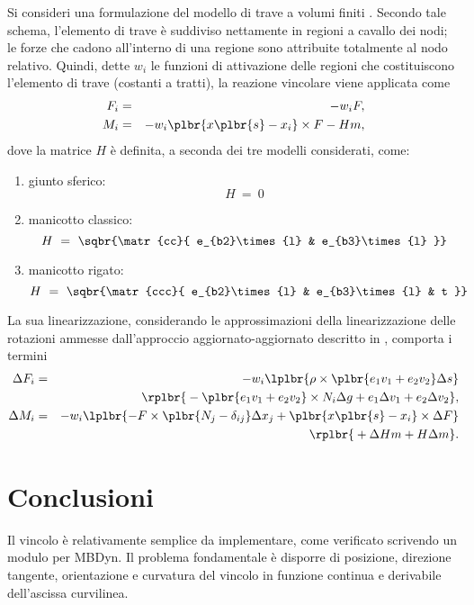 \documentclass[12pt,dvips,fleqn,italian]{article}
\begin{document}
\noindent
Si consideri una formulazione del modello di trave a volumi finiti
\cite{FV-AIAA}.
Secondo tale schema, l'elemento di trave \`{e} suddiviso nettamente in
regioni a cavallo dei nodi; le forze che cadono all'interno di una regione
sono attribuite totalmente al nodo relativo.
Quindi, dette $w_i$ le funzioni di attivazione delle regioni che
costituiscono l'elemento di trave (costanti a tratti), la reazione vincolare
viene applicata come
\begin{eqnarray*}
    F_i & = & - w_i F , \\
    M_i & = & - w_i \plbr{ x\plbr{s} - x_i }\times F 
        - H m ,
\end{eqnarray*}
dove la matrice $ H $ \`e definita, a seconda dei tre modelli considerati,
come:
\begin{enumerate}
	\item giunto sferico:
	\begin{displaymath}
		H \ = \ 0
	\end{displaymath}
	\item manicotto classico:
	\begin{displaymath}
		H \ = \ \sqbr{\matr{cc}{
			e_{b2}\times{l} & e_{b3}\times{l}
		}}
	\end{displaymath}
	\item manicotto rigato:
	\begin{displaymath}
		H \ = \ \sqbr{\matr{ccc}{
			e_{b2}\times{l} & e_{b3}\times{l} & t
		}}
	\end{displaymath}
\end{enumerate}
La sua linearizzazione, considerando le approssimazioni della
linearizzazione delle rotazioni ammesse dall'approccio aggiornato-aggiornato
descritto in \cite{PHD-MASARATI}, comporta i termini
\begin{eqnarray*}
    \Delta{F_i} & = & - w_i \lplbr{
        \rho \times \plbr{ e_1 v_1 + e_2 v_2 } \Delta{s}
    } \\
    & & \rplbr{ \mbox{}
	- \plbr{ e_1 v_1 + e_2 v_2 } \times N_i \Delta{g}
	+ e_1 \Delta{v_1} + e_2 \Delta{v_2}
    } , \\
    \Delta{M_i} & = & - w_i \lplbr{
        - F \times \plbr{ N_j - \delta_{ij} }\Delta{ x_j }
	+ \plbr{ x\plbr{s} - x_i }\times \Delta{F}
    } \\
    & & \rplbr{ \mbox{}
        + \Delta{H} m + H \Delta{m}
    } .
\end{eqnarray*}




\section*{Conclusioni}
Il vincolo \`{e} relativamente semplice da implementare, come verificato
scrivendo un modulo per MBDyn. 
Il problema fondamentale \`{e} disporre di posizione, direzione tangente,
orientazione e curvatura del vincolo in funzione continua e derivabile
dell'ascissa curvilinea.
\end{document}
